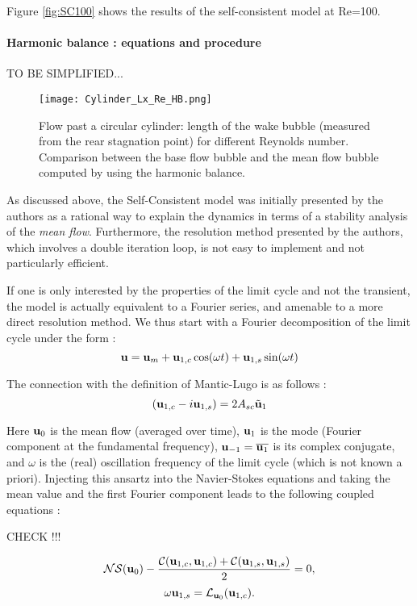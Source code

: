 \documentclass[twocolumn,10pt]{asme2ej}
\newcommand{\be}[1]{ \begin{equation} \label{#1}}
\newcommand{\ee}{\end{equation}}
\begin{document}
Figure \ref{fig:SC100} shows the results of the self-consistent model at Re=100.

\paragraph{Harmonic balance : equations and procedure }

TO BE SIMPLIFIED...

\begin{figure}
\begin{center}
\texttt{[image: Cylinder\_Lx\_Re\_HB.png]}
\end{center}
\caption{Flow past a circular cylinder: length of the wake bubble (measured from the 
rear stagnation point) for different Reynolds number. Comparison between the base flow bubble and the mean flow bubble computed by using the harmonic balance.}
\label{fig:Comp1}
\end{figure}
As discussed above, the Self-Consistent model was initially presented by the authors as a rational way to explain the dynamics in terms of a stability analysis of the {\em mean flow}. Furthermore, the resolution method presented by the authors, which involves a double iteration loop, is not easy to implement and not particularly efficient.

If one is only interested by the properties of the limit cycle and not the transient, the model is actually equivalent to a Fourier series, and amenable to a more direct resolution method. 
We thus start with a Fourier decomposition of the limit cycle under the form :
\be{HB}
{\bf u } = {\bf u }_m + {\bf u }_{1,c} \cos( \omega t ) +   {\bf u }_{1,s} \sin( \omega t )
\ee  

The connection with the definition of Mantic-Lugo is as follows :
\be{HBtoSC}
\left( {\bf u }_{1,c} - i {\bf u }_{1,s} \right) = 2 A_{sc} \tilde{{\bf u }}_1
\ee  



Here ${\bf u }_0$ is the mean flow (averaged over time),  ${\bf u }_1$ is the mode
(Fourier component at the fundamental frequency), ${\bf u }_{-1} = \overline{{\bf u }_1}$ is its complex conjugate, and $\omega$ is the (real) oscillation frequency of the limit cycle (which is not known a priori). Injecting this ansartz into the Navier-Stokes equations and taking the mean value and the first Fourier component leads to the following coupled equations :

CHECK !!!

\be{HBEq0}
{\cal NS}(  {\bf u }_0 ) - \frac{{\cal C}( {\bf u }_{1,c}, {\bf u }_{1,c}) +{\cal C}( {\bf u }_{1,s}, {\bf u }_{1,s})}{2}  = 0,
\ee
\be{HBEq1}
 \omega {\bf u }_{1,s} =  {\cal L}_{{\bf u }_0}(  {\bf u }_{1,c} ).
\ee
\end{document}
